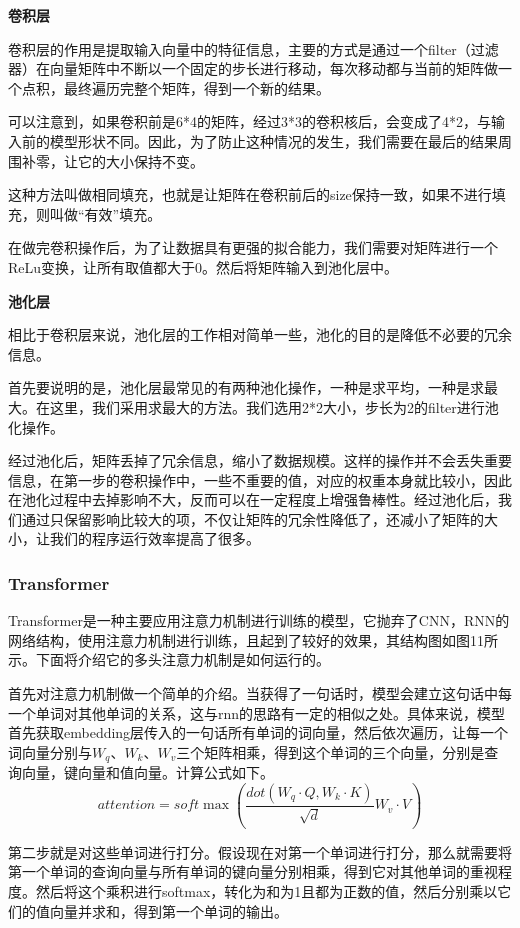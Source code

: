 \documentclass[letterpaper]{article}
\begin{document}
    \newpage
    \textbf{卷积层}
    
    卷积层的作用是提取输入向量中的特征信息，主要的方式是通过一个filter（过滤器）在向量矩阵中不断以一个固定的步长进行移动，每次移动都与当前的矩阵做一个点积，最终遍历完整个矩阵，得到一个新的结果。
    
    可以注意到，如果卷积前是6*4的矩阵，经过3*3的卷积核后，会变成了4*2，与输入前的模型形状不同。因此，为了防止这种情况的发生，我们需要在最后的结果周围补零，让它的大小保持不变。
    
    这种方法叫做相同填充，也就是让矩阵在卷积前后的size保持一致，如果不进行填充，则叫做“有效”填充。
    
    在做完卷积操作后，为了让数据具有更强的拟合能力，我们需要对矩阵进行一个ReLu变换，让所有取值都大于0。然后将矩阵输入到池化层中。
    
    \textbf{池化层}
    
    相比于卷积层来说，池化层的工作相对简单一些，池化的目的是降低不必要的冗余信息。
    
    首先要说明的是，池化层最常见的有两种池化操作，一种是求平均，一种是求最大。在这里，我们采用求最大的方法。我们选用2*2大小，步长为2的filter进行池化操作。
    
    经过池化后，矩阵丢掉了冗余信息，缩小了数据规模。这样的操作并不会丢失重要信息，在第一步的卷积操作中，一些不重要的值，对应的权重本身就比较小，因此在池化过程中去掉影响不大，反而可以在一定程度上增强鲁棒性。经过池化后，我们通过只保留影响比较大的项，不仅让矩阵的冗余性降低了，还减小了矩阵的大小，让我们的程序运行效率提高了很多。

    \subsubsection{Transformer}
    Transformer是一种主要应用注意力机制进行训练的模型，它抛弃了CNN，RNN的网络结构，使用注意力机制进行训练，且起到了较好的效果，其结构图如图11所示。下面将介绍它的多头注意力机制是如何运行的。

    首先对注意力机制做一个简单的介绍。当获得了一句话时，模型会建立这句话中每一个单词对其他单词的关系，这与rnn的思路有一定的相似之处。具体来说，模型首先获取embedding层传入的一句话所有单词的词向量，然后依次遍历，让每一个词向量分别与$W_q$、$W_k$、$W_v$三个矩阵相乘，得到这个单词的三个向量，分别是查询向量，键向量和值向量。计算公式如下。
    $$
    attention=soft\max \left( \frac{dot\left( W_q\cdot Q,W_k\cdot K \right)}{\sqrt{d}}W_v\cdot V \right) 
    $$
    
    第二步就是对这些单词进行打分。假设现在对第一个单词进行打分，那么就需要将第一个单词的查询向量与所有单词的键向量分别相乘，得到它对其他单词的重视程度。然后将这个乘积进行softmax，转化为和为1且都为正数的值，然后分别乘以它们的值向量并求和，得到第一个单词的输出。
    
\end{document}
